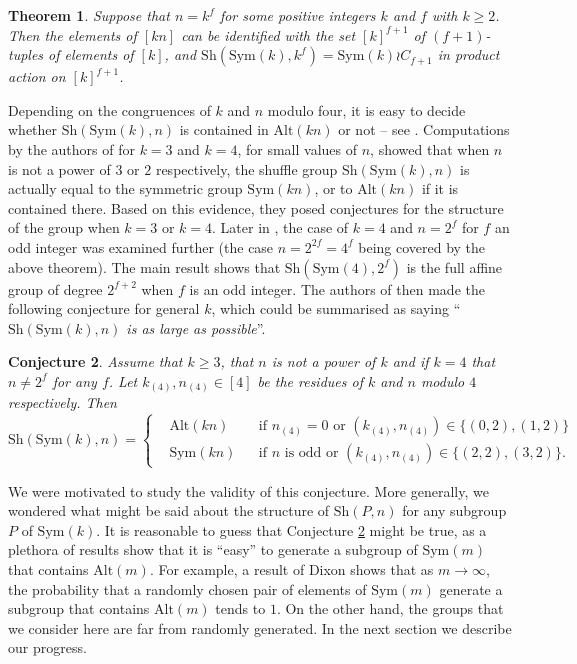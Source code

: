 \documentclass[12pt]{amsart}
\newtheorem{thm}{Theorem}[section]
\newtheorem{conj}[thm]{Conjecture}
\theoremstyle{remark}
\theoremstyle{definition}
\newcommand{\sym}{\mathrm{Sym}}
\newcommand{\alt}{\mathrm{Alt}}
\newcommand{\sh}{\mathrm{Sh}}
\begin{document}
\begin{thm} \cite[Theorem 2]{MM}
\label{thm:MMprod}
Suppose that $n = k^f$ for some positive integers $k$  and $f$ with $k \geqslant 2$. Then the elements of $[kn]$ can be identified with the set $[k]^{f+1}$ of $(f+1)$-tuples of elements of $[k]$, and $\sh(\sym(k),k^f) = \sym(k) \wr C_{f+1}$ in product action on $[k]^{f+1}$.
\end{thm}

Depending on the congruences of $k$ and $n$ modulo four, it is easy to decide whether $\sh(\sym(k),n)$ is contained in $\alt(kn)$ or not -- see \cite[Theorem 1]{MM}. Computations by the authors of \cite{MM} for $k=3$ and $k=4$, for small values of $n$, showed that when $n$ is not a power of $3$ or $2$ respectively, the shuffle group $\sh(\sym(k),n)$  is actually equal to the symmetric group $\sym(kn)$, or to $\alt(kn)$ if it is contained there. Based on this evidence, they posed conjectures for the structure of the group when $k=3$ or $k=4$. Later in \cite{CHMW}, the case of $k=4$ and $n=2^{f}$ for $f$ an odd integer was examined further (the case $n=2^{2f}=4^f$ being covered by the above theorem). The main result \cite[Theorem 2.6]{CHMW} shows that  $\sh(\sym(4),2^f)$ is the full affine group of degree $2^{f+2}$  when $f$ is an odd integer. The authors of \cite{CHMW} then made the following conjecture for general $k$, which  could be summarised as saying ``\emph{$\sh(\sym(k),n)$ is as large as possible}''.
%

\begin{conj} \cite[Conjecture 1.1]{CHMW}
\label{conj:CHMW}
Assume that $k \geqslant 3$, that $n$ is not a power of $k$ and if $k=4$ that $n \neq 2^f$ for any $f$. Let $k_{(4)}, n_{(4)} \in [4]$ be the residues of $k$ and $n$ modulo $4$ respectively.
  Then
	\[ \sh(\sym(k),n) = \left\{ \begin{aligned} &\alt(kn) &&\text{if $n_{(4)} = 0$ or $(k_{(4)}, n_{(4)}) \in \{ (0,2), (1,2) \}$} \\ &\sym(kn) &&\text{if $n$ is odd or $(k_{(4)}, n_{(4)}) \in \{ (2,2), (3,2) \}$}. \end{aligned} \right. \]
\end{conj}

We were motivated to study the validity of this conjecture.  More generally, we wondered what might be said about the structure of $\sh(P,n)$ for any subgroup $P$ of $\sym(k)$. It is reasonable to guess that Conjecture \ref{conj:CHMW} might be true, as a plethora of results show that it is ``easy'' to generate a subgroup of $\sym(m)$ that contains $\alt(m)$. For example, a result of Dixon \cite{dixon} shows that as $m \rightarrow \infty$, the probability that a randomly chosen pair of elements of $\sym(m)$ generate a subgroup that contains $\alt(m)$ tends to $1$.  On the other hand, the groups that we consider here are far from randomly generated. In the next section we describe our progress.
\end{document}
